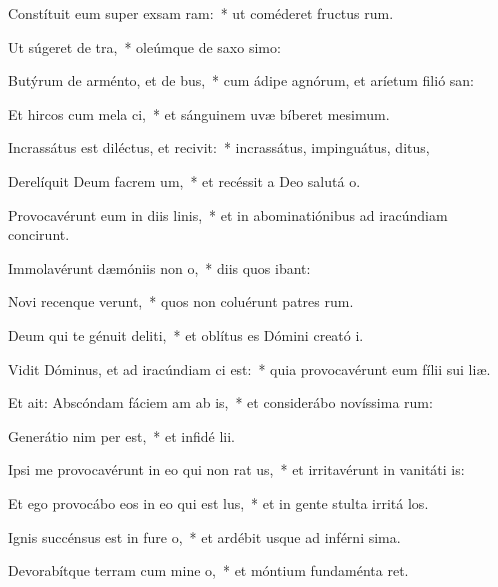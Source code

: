 \item Constítuit eum super exsam ram:~* ut coméderet fructus rum.
\item Ut súgeret  de tra,~* oleúmque de saxo simo:
\item Butýrum de arménto, et  de bus,~* cum ádipe agnórum, et aríetum filió san:
\item Et hircos cum mela ci,~* et sánguinem uvæ bíberet mesimum.
\item Incrassátus est diléctus, et recivit:~* incrassátus, impinguátus, ditus,
\item Derelíquit Deum facrem um,~* et recéssit a Deo salutá o.
\item Provocavérunt eum in diis linis,~* et in abominatiónibus ad iracúndiam concirunt.
\item Immolavérunt dæmóniis  non o,~* diis quos ibant:
\item Novi recenque verunt,~* quos non coluérunt patres rum.
\item Deum qui te génuit deliti,~* et oblítus es Dómini creató i.
\item \singlecolsep
\item Vidit Dóminus, et ad iracúndiam ci est:~* quia provocavérunt eum fílii sui  liæ.
\item Et ait: Abscóndam fáciem am ab is,~* et considerábo novíssima rum:
\item Generátio nim per est,~* et infidé lii.
\item Ipsi me provocavérunt in eo qui non rat us,~* et irritavérunt in vanitáti is:
\item Et ego provocábo eos in eo qui  est lus,~* et in gente stulta irritá los.
\item Ignis succénsus est in fure o,~* et ardébit usque ad inférni sima.
\item Devorabítque terram cum mine o,~* et móntium fundaménta ret.
